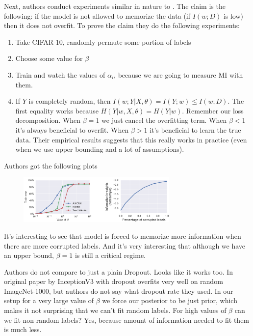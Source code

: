 \documentclass{article}
\begin{document}
Next, authors conduct experiments similar in nature to \cite{We_dont_know_what_generalization_is}.
The claim is the following: if the model is not allowed to memorize the data (if $I(w;D)$ is low) then it does not overfit.
To prove the claim they do the following experiments:
\begin{enumerate}
    \item Take CIFAR-10, randomly permute some portion of labels
    \item Choose some value for $\beta$
    \item Train and watch the values of $\alpha_i$, because we are going to measure MI with them.
    \item If $Y$ is completely random, then $I(w;Y|X,\theta) = I(Y;w) \leq I(w;D)$. The first equality works because $H(Y|w,X,\theta) = H(Y|w)$. Remember our loss decomposition. When $\beta = 1$ we just cancel the overfitting term. When $\beta < 1$ it's always beneficial to overfit. When $\beta > 1$ it's beneficial to learn the true data. Their empirical results suggests that this really works in practice (even when we use upper bounding and a lot of assumptions).
\end{enumerate}

Authors got the following plots

\begin{figure}[H]
\centering
\includegraphics[width=0.7\textwidth]{emergence_of_invariance_MI_experiments}
\end{figure}

It's interesting to see that model is forced to memorize more information when there are more corrupted labels.
And it's very interesting that although we have an upper bound, $\beta = 1$ is still a critical regime.

\begin{remark}
Authors do not compare to just a plain Dropout.
Looks like it works too.
In original paper by \cite{We_dont_know_what_generalization_is} InceptionV3 with dropout overfits very well on random ImageNet-1000, but authors do not say what dropout rate they used.
In our setup for a very large value of $\beta$ we force our posterior to be just prior, which makes it not surprising that we can't fit random labels.
For high values of $\beta$ can we fit non-random labels? Yes, because amount of information needed to fit them is much less.
\end{remark}
\end{document}
